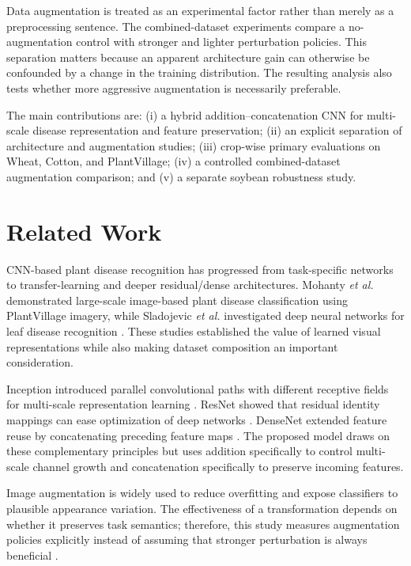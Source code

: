 \documentclass[a4paper,fleqn]{cas-dc}
\begin{document}
Data augmentation is treated as an experimental factor rather than merely as a preprocessing sentence. The combined-dataset experiments compare a no-augmentation control with stronger and lighter perturbation policies. This separation matters because an apparent architecture gain can otherwise be confounded by a change in the training distribution. The resulting analysis also tests whether more aggressive augmentation is necessarily preferable.

The main contributions are: (i) a hybrid addition--concatenation CNN for multi-scale disease representation and feature preservation; (ii) an explicit separation of architecture and augmentation studies; (iii) crop-wise primary evaluations on Wheat, Cotton, and PlantVillage; (iv) a controlled combined-dataset augmentation comparison; and (v) a separate soybean robustness study.

\section{Related Work}
CNN-based plant disease recognition has progressed from task-specific networks to transfer-learning and deeper residual/dense architectures. Mohanty \textit{et al.} demonstrated large-scale image-based plant disease classification using PlantVillage imagery, while Sladojevic \textit{et al.} investigated deep neural networks for leaf disease recognition \citep{mohanty2016using,sladojevic2016deep}. These studies established the value of learned visual representations while also making dataset composition an important consideration.

Inception introduced parallel convolutional paths with different receptive fields for multi-scale representation learning \citep{szegedy2015going}. ResNet showed that residual identity mappings can ease optimization of deep networks \citep{he2016deep}. DenseNet extended feature reuse by concatenating preceding feature maps \citep{huang2017densely}. The proposed model draws on these complementary principles but uses addition specifically to control multi-scale channel growth and concatenation specifically to preserve incoming features.

Image augmentation is widely used to reduce overfitting and expose classifiers to plausible appearance variation. The effectiveness of a transformation depends on whether it preserves task semantics; therefore, this study measures augmentation policies explicitly instead of assuming that stronger perturbation is always beneficial \citep{shorten2019survey}.
\end{document}
